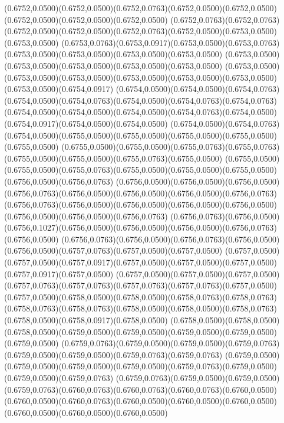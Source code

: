 (0.6752,0.0500)(0.6752,0.0500)(0.6752,0.0763)(0.6752,0.0500)(0.6752,0.0500)(0.6752,0.0500)(0.6752,0.0500)(0.6752,0.0500)
(0.6752,0.0763)(0.6752,0.0763)(0.6752,0.0500)(0.6752,0.0500)(0.6752,0.0763)(0.6752,0.0500)(0.6753,0.0500)(0.6753,0.0500)
(0.6753,0.0763)(0.6753,0.0917)(0.6753,0.0500)(0.6753,0.0763)(0.6753,0.0500)(0.6753,0.0500)(0.6753,0.0500)(0.6753,0.0500)
(0.6753,0.0500)(0.6753,0.0500)(0.6753,0.0500)(0.6753,0.0500)(0.6753,0.0500)
\PST@Solid(0.6753,0.0500)(0.6753,0.0500)(0.6753,0.0500)(0.6753,0.0500)(0.6753,0.0500)(0.6753,0.0500)(0.6753,0.0500)(0.6754,0.0917)
(0.6754,0.0500)(0.6754,0.0500)(0.6754,0.0763)(0.6754,0.0500)(0.6754,0.0763)(0.6754,0.0500)(0.6754,0.0763)(0.6754,0.0763)
(0.6754,0.0500)(0.6754,0.0500)(0.6754,0.0500)(0.6754,0.0763)(0.6754,0.0500)(0.6754,0.0917)(0.6754,0.0500)(0.6754,0.0500)
(0.6754,0.0500)(0.6754,0.0763)(0.6754,0.0500)(0.6755,0.0500)(0.6755,0.0500)(0.6755,0.0500)(0.6755,0.0500)(0.6755,0.0500)
(0.6755,0.0500)(0.6755,0.0500)(0.6755,0.0763)(0.6755,0.0763)(0.6755,0.0500)(0.6755,0.0500)(0.6755,0.0763)(0.6755,0.0500)
(0.6755,0.0500)(0.6755,0.0500)(0.6755,0.0763)(0.6755,0.0500)(0.6755,0.0500)(0.6755,0.0500)(0.6756,0.0500)(0.6756,0.0763)
(0.6756,0.0500)(0.6756,0.0500)(0.6756,0.0500)(0.6756,0.0763)(0.6756,0.0500)(0.6756,0.0500)(0.6756,0.0500)(0.6756,0.0763)
(0.6756,0.0763)(0.6756,0.0500)(0.6756,0.0500)(0.6756,0.0500)(0.6756,0.0500)(0.6756,0.0500)(0.6756,0.0500)(0.6756,0.0763)
(0.6756,0.0763)(0.6756,0.0500)(0.6756,0.1027)(0.6756,0.0500)(0.6756,0.0500)(0.6756,0.0500)(0.6756,0.0763)(0.6756,0.0500)
(0.6756,0.0763)(0.6756,0.0500)(0.6756,0.0763)(0.6756,0.0500)(0.6756,0.0500)(0.6757,0.0763)(0.6757,0.0500)(0.6757,0.0500)
(0.6757,0.0500)(0.6757,0.0500)(0.6757,0.0917)(0.6757,0.0500)(0.6757,0.0500)(0.6757,0.0500)(0.6757,0.0917)(0.6757,0.0500)
(0.6757,0.0500)(0.6757,0.0500)(0.6757,0.0500)(0.6757,0.0763)(0.6757,0.0763)(0.6757,0.0763)(0.6757,0.0763)(0.6757,0.0500)
(0.6757,0.0500)(0.6758,0.0500)(0.6758,0.0500)(0.6758,0.0763)(0.6758,0.0763)
\PST@Solid(0.6758,0.0763)(0.6758,0.0763)(0.6758,0.0500)(0.6758,0.0500)(0.6758,0.0763)(0.6758,0.0500)(0.6758,0.0917)(0.6758,0.0500)
(0.6758,0.0500)(0.6758,0.0500)(0.6758,0.0500)(0.6759,0.0500)(0.6759,0.0500)(0.6759,0.0500)(0.6759,0.0500)(0.6759,0.0500)
(0.6759,0.0763)(0.6759,0.0500)(0.6759,0.0500)(0.6759,0.0763)(0.6759,0.0500)(0.6759,0.0500)(0.6759,0.0763)(0.6759,0.0763)
(0.6759,0.0500)(0.6759,0.0500)(0.6759,0.0500)(0.6759,0.0500)(0.6759,0.0763)(0.6759,0.0500)(0.6759,0.0500)(0.6759,0.0763)
(0.6759,0.0763)(0.6759,0.0500)(0.6759,0.0500)(0.6759,0.0763)(0.6760,0.0763)(0.6760,0.0763)(0.6760,0.0763)(0.6760,0.0500)
(0.6760,0.0500)(0.6760,0.0763)(0.6760,0.0500)(0.6760,0.0500)(0.6760,0.0500)(0.6760,0.0500)(0.6760,0.0500)(0.6760,0.0500)
